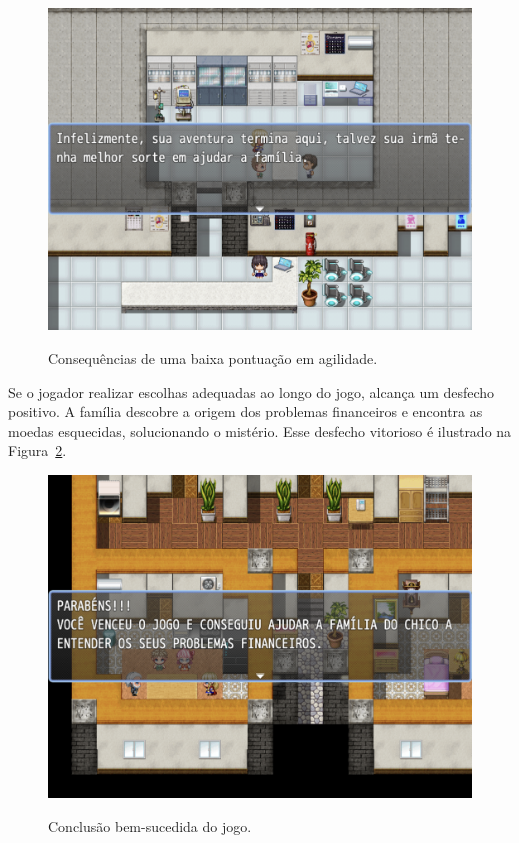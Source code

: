 \begin{figure}[!htbp]
	\centering
	\caption{Consequências de uma baixa pontuação em agilidade.}
	\includegraphics[scale=0.4]{Textuais/Pictures/game-over.png}
	\label{fig:game-over}
\end{figure}

Se o jogador realizar escolhas adequadas ao longo do jogo, alcança um desfecho positivo. A família descobre a origem dos problemas financeiros e encontra as moedas esquecidas, solucionando o mistério. Esse desfecho vitorioso é ilustrado na Figura~\ref{fig:vitoria}.

\begin{figure}[!htbp]
	\centering
	\caption{Conclusão bem-sucedida do jogo.}
	\includegraphics[scale=0.4]{Textuais/Pictures/vitoria.png}
	\label{fig:vitoria}
\end{figure}

